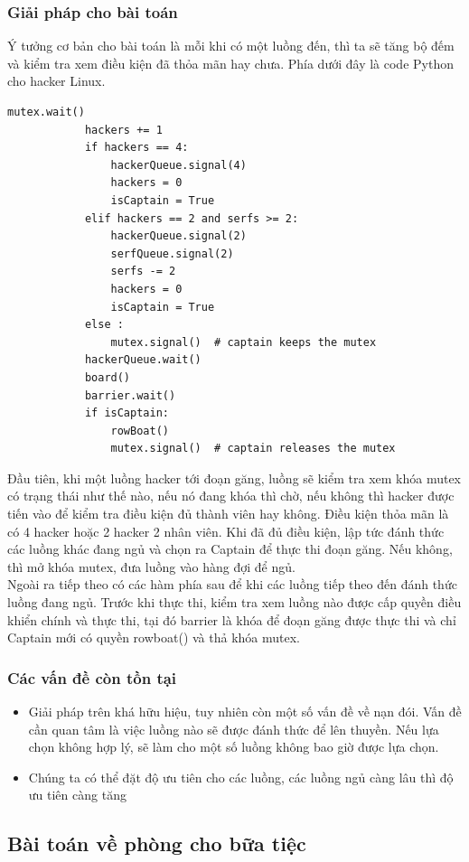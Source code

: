 \documentclass[12pt]{article}
\begin{document}
    	\subsubsection{Giải pháp cho bài toán}
    	Ý tưởng cơ bản cho bài toán là mỗi khi có một luồng đến, thì ta sẽ tăng bộ đếm và kiểm tra xem điều kiện đã thỏa mãn hay chưa. Phía dưới đây là code Python cho hacker Linux.
\newpage
     	\begin{lstlisting}[style = Python]
    			mutex.wait()
			hackers += 1
			if hackers == 4:
				hackerQueue.signal(4)
				hackers = 0
				isCaptain = True
			elif hackers == 2 and serfs >= 2:
				hackerQueue.signal(2)
				serfQueue.signal(2)
				serfs -= 2
				hackers = 0
				isCaptain = True
			else :
				mutex.signal()	# captain keeps the mutex
			hackerQueue.wait()
			board()
			barrier.wait()
			if isCaptain:
				rowBoat()
				mutex.signal()	# captain releases the mutex
    	\end{lstlisting}
    	Đầu tiên, khi một luồng hacker tới đoạn găng, luồng sẽ kiểm tra xem khóa mutex có trạng thái như thế nào, nếu nó đang khóa thì chờ, nếu không thì hacker được tiến vào để kiểm tra điều kiện đủ thành viên hay không. Điều kiện thỏa mãn là có 4 hacker hoặc 2 hacker 2 nhân viên. Khi đã đủ điều kiện, lập tức đánh thức các luồng khác đang ngủ và chọn ra Captain để thực thi đoạn găng. Nếu không, thì mở khóa mutex, đưa luồng vào hàng đợi để ngủ.\\
    	Ngoài ra tiếp theo có các hàm phía sau để khi các luồng tiếp theo đến đánh thức luồng đang ngủ. Trước khi thực thi, kiểm tra xem luồng nào được cấp quyền điều khiển chính và thực thi, tại đó barrier là khóa để đoạn găng được thực thi và chỉ Captain mới có quyền rowboat() và thả khóa mutex.
    	\subsubsection{Các vấn đề còn tồn tại}
    	\begin{itemize}
    	\item Giải pháp trên khá hữu hiệu, tuy nhiên còn một số vấn đề về nạn đói. Vấn đề cần quan tâm là việc luồng nào sẽ được đánh thức để lên thuyền. Nếu lựa chọn không hợp lý, sẽ làm cho một số luồng không bao giờ được lựa chọn.
    	\item Chúng ta có thể đặt độ ưu tiên cho các luồng, các luồng ngủ càng lâu thì độ ưu tiên càng tăng
    	\end{itemize}
    \subsection{Bài toán về phòng cho bữa tiệc}
\end{document}
